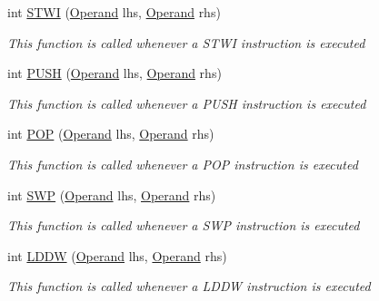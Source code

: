 \begin{DoxyCompactItemize}
int \hyperlink{class_c_p_u___o_s___simulator_1_1_c_p_u_1_1_instruction_aec8b426958aee888d46d9cbb565ed548}{S\+T\+W\+I} (\hyperlink{class_c_p_u___o_s___simulator_1_1_c_p_u_1_1_operand}{Operand} lhs, \hyperlink{class_c_p_u___o_s___simulator_1_1_c_p_u_1_1_operand}{Operand} rhs)
\begin{DoxyCompactList}\small\item\em This function is called whenever a S\+T\+W\+I instruction is executed \end{DoxyCompactList}\item 
int \hyperlink{class_c_p_u___o_s___simulator_1_1_c_p_u_1_1_instruction_a4a6711b8309af629c9460cdadc340444}{P\+U\+S\+H} (\hyperlink{class_c_p_u___o_s___simulator_1_1_c_p_u_1_1_operand}{Operand} lhs, \hyperlink{class_c_p_u___o_s___simulator_1_1_c_p_u_1_1_operand}{Operand} rhs)
\begin{DoxyCompactList}\small\item\em This function is called whenever a P\+U\+S\+H instruction is executed \end{DoxyCompactList}\item 
int \hyperlink{class_c_p_u___o_s___simulator_1_1_c_p_u_1_1_instruction_a16a47493684bb30a289d337188fb77b6}{P\+O\+P} (\hyperlink{class_c_p_u___o_s___simulator_1_1_c_p_u_1_1_operand}{Operand} lhs, \hyperlink{class_c_p_u___o_s___simulator_1_1_c_p_u_1_1_operand}{Operand} rhs)
\begin{DoxyCompactList}\small\item\em This function is called whenever a P\+O\+P instruction is executed \end{DoxyCompactList}\item 
int \hyperlink{class_c_p_u___o_s___simulator_1_1_c_p_u_1_1_instruction_ac86363232497de67ac268dd8942294a3}{S\+W\+P} (\hyperlink{class_c_p_u___o_s___simulator_1_1_c_p_u_1_1_operand}{Operand} lhs, \hyperlink{class_c_p_u___o_s___simulator_1_1_c_p_u_1_1_operand}{Operand} rhs)
\begin{DoxyCompactList}\small\item\em This function is called whenever a S\+W\+P instruction is executed \end{DoxyCompactList}\item 
int \hyperlink{class_c_p_u___o_s___simulator_1_1_c_p_u_1_1_instruction_a3c22b47d66b4c92120eba7b2d77eb92f}{L\+D\+D\+W} (\hyperlink{class_c_p_u___o_s___simulator_1_1_c_p_u_1_1_operand}{Operand} lhs, \hyperlink{class_c_p_u___o_s___simulator_1_1_c_p_u_1_1_operand}{Operand} rhs)
\begin{DoxyCompactList}\small\item\em This function is called whenever a L\+D\+D\+W instruction is executed \end{DoxyCompactList}\item 

\end{DoxyCompactItemize}
